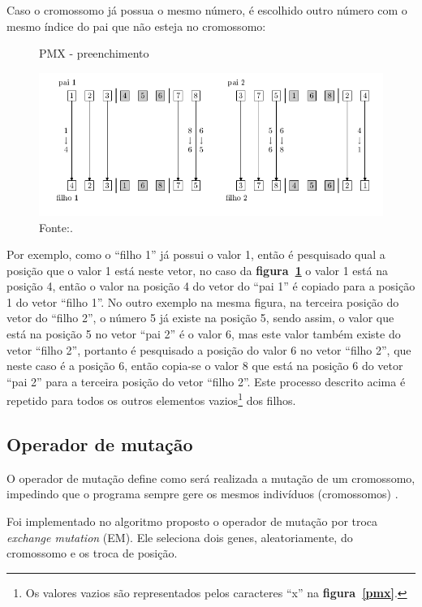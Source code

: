 \documentclass[12pt,openright,a4paper,oneside]{tcc}
\begin{document}
	   		Caso o cromossomo já possua o mesmo número, é escolhido outro número com o mesmo índice do pai que não esteja no cromossomo:
	   		\begin{figure}[h]
				\centering
                \caption{PMX - preenchimento}
		        \includegraphics[width = 14cm,keepaspectratio]{img/pmx2.png}		        
		        \caption*{Fonte:\cite{0012-pdf}.}
		        \label{pmx2}
	   		\end{figure}

	   		Por exemplo, como o ``filho 1'' já possui o valor 1, então é pesquisado qual a posição que o valor 1 está neste vetor, no caso da \textbf{figura~\ref{pmx2}} o valor 1 está na posição 4, então o valor na posição 4 do vetor do ``pai 1'' é copiado para a posição 1 do vetor ``filho 1''. No outro exemplo na mesma figura, na terceira posição do vetor do ``filho 2'',  o número 5 já existe na posição 5, sendo assim, o valor que está na posição 5 no vetor ``pai 2'' é o valor 6, mas este valor também existe do vetor ``filho 2'', portanto é pesquisado a posição do valor 6 no vetor ``filho 2'', que neste caso é a posição 6, então copia-se o valor 8 que está na posição 6 do vetor ``pai 2'' para a terceira posição do vetor ``filho 2''. 
	   		Este processo descrito acima é repetido para todos os outros elementos vazios\footnote{Os valores vazios são representados pelos caracteres ``x'' na \textbf{figura~\ref{pmx}}.} dos filhos.
	   		  
		\subsection{Operador de mutação}
			\label{Sem}
			O operador de mutação define como será realizada a mutação de um cromossomo, impedindo que o programa sempre gere os mesmos indivíduos (cromossomos) \cite{0012-pdf}.

			Foi implementado no algoritmo proposto o operador de mutação por troca \textit{exchange mutation} (EM). Ele seleciona dois genes, aleatoriamente, do cromossomo e os troca de posição.
\end{document}
